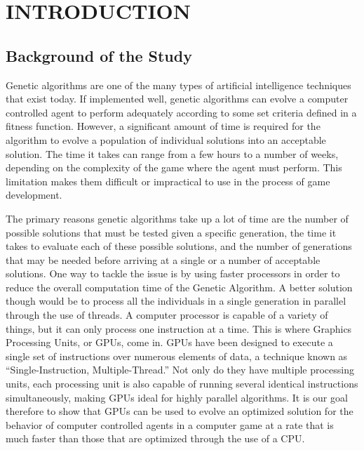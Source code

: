 \chapter{INTRODUCTION}

\section{Background of the Study}

Genetic algorithms are one of the many types of artificial intelligence
techniques that exist today. If implemented well, genetic algorithms can
evolve a computer controlled agent to perform adequately according to some
set criteria defined in a fitness function. However, a significant amount of 
time is required for the algorithm to evolve a population of individual solutions 
into an acceptable solution\cite{Schwab04}. The time it takes can range from
a few hours to a number of weeks, depending on the complexity of the game where
the agent must perform. This limitation makes them difficult or impractical to
use in the process of game development\cite{Schwab04}.

The primary reasons genetic algorithms take up a lot of time are the number of 
possible solutions that must be tested given a specific generation, the time it 
takes to evaluate each of these possible solutions, and the number of generations 
that may be needed before arriving at a single or a number of acceptable solutions\cite{Schwab04}. 
One way to tackle the issue is by using faster processors in order to reduce the
overall computation time of the Genetic Algorithm. A better solution though would
be to process all the individuals in a single generation in parallel through the
use of threads. A computer processor is capable of a variety of things, but it can only process
one instruction at a time. This is where Graphics Processing Units, or GPUs, come in.
GPUs have been designed to execute a single set of instructions over numerous elements
of data, a technique known as ``Single-Instruction, Multiple-Thread\cite{pdf:NVCudaPrgGuide}.''
Not only do they have multiple processing units, each processing unit is also
capable of running several identical instructions simultaneously, making GPUs ideal
for highly parallel algorithms\cite{pdf:NVCudaPrgGuide}. It is our goal therefore to
show that GPUs can be used to evolve an optimized solution for the behavior of computer
controlled agents in a computer game at a rate that is much faster than those that are optimized
through the use of a CPU.

